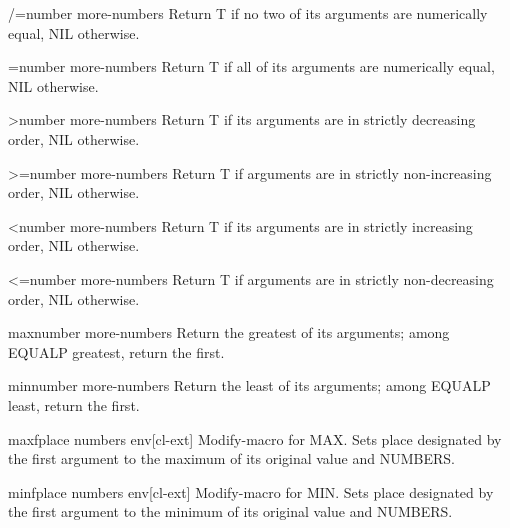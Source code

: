 \documentclass[10pt,english]{book}
\begin{document}
\begin{function}{/=}{number \rest more-numbers}
  Return T if no two of its arguments are numerically equal, NIL otherwise.
\end{function}

\begin{function}{=}{number \rest more-numbers}
  Return T if all of its arguments are numerically equal, NIL otherwise.
\end{function}

\begin{function}{>}{number \rest more-numbers}
  Return T if its arguments are in strictly decreasing order, NIL otherwise.
\end{function}

\begin{function}{>=}{number \rest more-numbers}
  Return T if arguments are in strictly non-increasing order, NIL otherwise.
\end{function}

\begin{function}{<}{number \rest more-numbers}
  Return T if its arguments are in strictly increasing order, NIL otherwise.
\end{function}

\begin{function}{<=}{number \rest more-numbers}
  Return T if arguments are in strictly non-decreasing order, NIL otherwise.
\end{function}

\begin{function}{max}{number \rest more-numbers}
  Return the greatest of its arguments; among EQUALP greatest, return
the first.
\end{function}

\begin{function}{min}{number \rest more-numbers}
  Return the least of its arguments; among EQUALP least, return
the first.
\end{function}

\begin{macro}{maxf}{place \rest numbers \env env}[cl-ext]
  Modify-macro for MAX. Sets place designated by the first argument to the
maximum of its original value and NUMBERS.
\end{macro}

\begin{macro}{minf}{place \rest numbers \env env}[cl-ext]
  Modify-macro for MIN. Sets place designated by the first argument to the
minimum of its original value and NUMBERS.
\end{macro}
\end{document}
